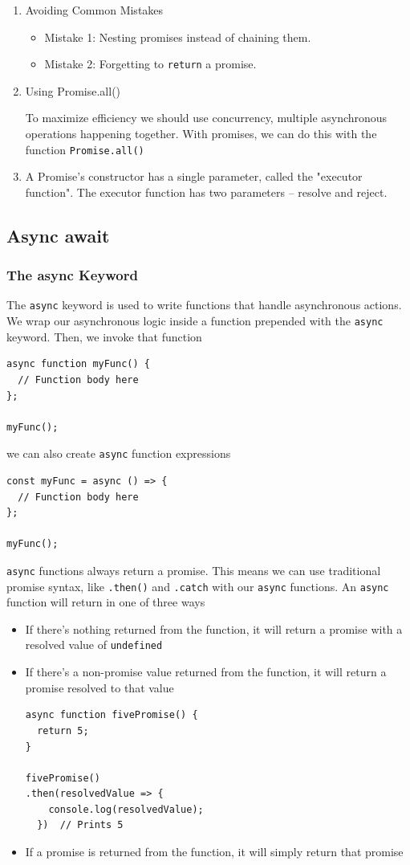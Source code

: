 \documentclass[a4paper, 12pt]{article}
\begin{document}
\begin{enumerate}
\item Avoiding Common Mistakes
\begin{itemize}
\item Mistake 1: Nesting promises instead of chaining them.
\item Mistake 2: Forgetting to \verb|return| a promise.
\end{itemize}

\item Using Promise.all()

To maximize efficiency we should use concurrency, multiple asynchronous operations happening together. With promises, we can do this with the function \verb|Promise.all()|

\item A Promise's constructor has a single parameter, called the "executor function". The executor function has two parameters -- resolve and reject.

\end{enumerate}

\subsection{Async await}
\subsubsection{The async Keyword}
The \verb|async| keyword is used to write functions that handle asynchronous actions. We wrap our asynchronous logic inside a function prepended with the \verb|async| keyword. Then, we invoke that function
\begin{verbatim}
async function myFunc() {
  // Function body here
};

myFunc();
\end{verbatim}
we can also create \verb|async| function expressions
\begin{verbatim}
const myFunc = async () => {
  // Function body here
};

myFunc();
\end{verbatim}
\verb|async| functions always return a promise. This means we can use traditional promise syntax, like \verb|.then()| and \verb|.catch| with our \verb|async| functions. An \verb|async| function will return in one of three ways
\begin{itemize}
\item If there's nothing returned from the function, it will return a promise with a resolved value of \verb|undefined|
\item If there's a non-promise value returned from the function, it will return a promise resolved to that value
\begin{verbatim}
async function fivePromise() { 
  return 5;
}

fivePromise()
.then(resolvedValue => {
    console.log(resolvedValue);
  })  // Prints 5
\end{verbatim}

\item If a promise is returned from the function, it will simply return that promise
\end{itemize}
\end{document}
